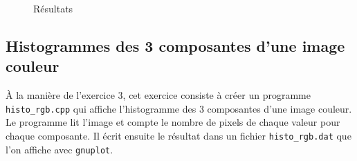 \documentclass[11pt]{article}
\begin{document}
\begin{figure}[!htb]
  \centering
  \caption{Résultats}
\end{figure}

\FloatBarrier

\clearpage
\subsection{Histogrammes des 3 composantes d'une image couleur}
À la manière de l'exercice 3, cet exercice consiste à créer un programme \texttt{histo\_rgb.cpp} qui affiche l'histogramme des 3 composantes d'une image couleur. Le programme lit l'image et compte le nombre de pixels de chaque valeur pour chaque composante. Il écrit ensuite le résultat dans un fichier \texttt{histo\_rgb.dat} que l'on affiche avec \texttt{gnuplot}.
\end{document}
